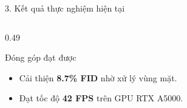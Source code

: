 \documentclass[aspectratio=169,11pt]{beamer}
\begin{document}
\begin{frame}{3. Kết quả thực nghiệm hiện tại}
\begin{columns}[T]
\begin{column}{0.49\textwidth}
\vspace*{-0.1cm}
\begin{exampleblock}{Đóng góp đạt được}
\begin{itemize}\itemsep=1pt
    \item Cải thiện \textbf{8.7\% FID} nhờ xử lý vùng mặt.
    \item Đạt tốc độ \textbf{42 FPS} trên GPU RTX A5000.
\end{itemize}
\end{exampleblock}

\end{column}
\end{columns}

\end{frame}


\end{document}

